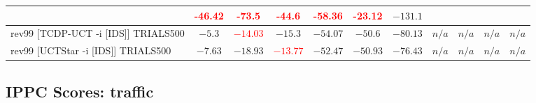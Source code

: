 \documentclass{article}
\begin{document}
\begin{tabular}{|l|r@{$\pm$}rr@{$\pm$}rr@{$\pm$}rr@{$\pm$}rr@{$\pm$}rr@{$\pm$}rr@{$\pm$}rr@{$\pm$}rr@{$\pm$}rr@{$\pm$}r|}
& \multicolumn{2}{c}{\textbf{\textcolor{red}{-46.42}}}
& \multicolumn{2}{c}{\textbf{\textcolor{red}{-73.5}}}
& \multicolumn{2}{c}{\textbf{\textcolor{red}{-44.6}}}
& \multicolumn{2}{c}{\textbf{\textcolor{red}{-58.36}}}
& \multicolumn{2}{c}{\textbf{\textcolor{red}{-23.12}}}
& \multicolumn{2}{c|}{$-131.1$}
\\
\hline
rev99 [TCDP-UCT -i [IDS]] TRIALS500
& \multicolumn{2}{c}{\textbf{$-5.3$}}
& \multicolumn{2}{c}{\textbf{\textcolor{red}{$-14.03$}}}
& \multicolumn{2}{c}{\textbf{$-15.3$}}
& \multicolumn{2}{c}{$-54.07$}
& \multicolumn{2}{c}{$-50.6$}
& \multicolumn{2}{c}{$-80.13$}
& \multicolumn{2}{c}{\textbf{$n/a$}}
& \multicolumn{2}{c}{\textbf{$n/a$}}
& \multicolumn{2}{c}{\textbf{$n/a$}}
& \multicolumn{2}{c|}{\textbf{$n/a$}}
\\
rev99 [UCTStar -i [IDS]] TRIALS500
& \multicolumn{2}{c}{$-7.63$}
& \multicolumn{2}{c}{$-18.93$}
& \multicolumn{2}{c}{\textbf{\textcolor{red}{$-13.77$}}}
& \multicolumn{2}{c}{$-52.47$}
& \multicolumn{2}{c}{$-50.93$}
& \multicolumn{2}{c}{\textbf{$-76.43$}}
& \multicolumn{2}{c}{\textbf{$n/a$}}
& \multicolumn{2}{c}{\textbf{$n/a$}}
& \multicolumn{2}{c}{\textbf{$n/a$}}
& \multicolumn{2}{c|}{\textbf{$n/a$}}
\\
\hline
\end{tabular}%

\bigskip

\subsection*{IPPC Scores: traffic}
\end{document}
